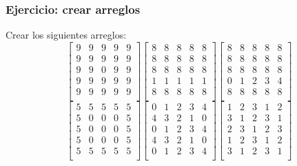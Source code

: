 \documentclass[12pt]{beamer}
\begin{document}
  \begin{frame}
    \label{ejercicio-crear-arreglo}
    \frametitle{Ejercicio: crear arreglos}
    Crear los siguientes arreglos:
    \[
      \begin{bmatrix}
        9 & 9 & 9 & 9 & 9 \\
        9 & 9 & 9 & 9 & 9 \\
        9 & 9 & 0 & 9 & 9 \\
        9 & 9 & 9 & 9 & 9 \\
        9 & 9 & 9 & 9 & 9 \\
      \end{bmatrix}
      \begin{bmatrix}
        8 & 8 & 8 & 8 & 8 \\
        8 & 8 & 8 & 8 & 8 \\
        8 & 8 & 8 & 8 & 8 \\
        1 & 1 & 1 & 1 & 1 \\
        8 & 8 & 8 & 8 & 8 \\
      \end{bmatrix}
      \begin{bmatrix}
        8 & 8 & 8 & 8 & 8 \\
        8 & 8 & 8 & 8 & 8 \\
        8 & 8 & 8 & 8 & 8 \\
        0 & 1 & 2 & 3 & 4 \\
        8 & 8 & 8 & 8 & 8 \\
      \end{bmatrix}
    \]
    \[
      \begin{bmatrix}
        5 & 5 & 5 & 5 & 5 \\
        5 & 0 & 0 & 0 & 5 \\
        5 & 0 & 0 & 0 & 5 \\
        5 & 0 & 0 & 0 & 5 \\
        5 & 5 & 5 & 5 & 5 \\
      \end{bmatrix}
      \begin{bmatrix}
        0 & 1 & 2 & 3 & 4 \\
        4 & 3 & 2 & 1 & 0 \\
        0 & 1 & 2 & 3 & 4 \\
        4 & 3 & 2 & 1 & 0 \\
        0 & 1 & 2 & 3 & 4 \\
      \end{bmatrix}
      \begin{bmatrix}
        1 & 2 & 3 & 1 & 2 \\
        3 & 1 & 2 & 3 & 1 \\
        2 & 3 & 1 & 2 & 3 \\
        1 & 2 & 3 & 1 & 2 \\
        3 & 1 & 2 & 3 & 1 \\
      \end{bmatrix}
    \]
  \end{frame}
\end{document}
